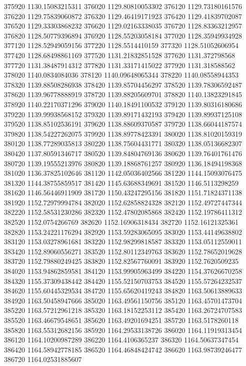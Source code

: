 {375920 1130.15083215311
376020 1129.80810053302
376120 1129.73180161576
376220 1129.75839060872
376320 1129.46419171923
376420 1129.41839702087
376520 1129.33303868232
376620 1129.02163338035
376720 1128.83363212957
376820 1128.50779396894
376920 1128.55203058184
377020 1128.35949934928
377120 1128.52949059156
377220 1128.5514410159
377320 1128.51052606954
377420 1128.68498861169
377520 1131.21832851528
377620 1131.372798568
377720 1131.38487914312
377820 1131.33171415022
377920 1131.318588562
378020 1140.0834084036
378120 1140.09648065344
378220 1140.08558944353
378320 1139.88508286938
378420 1139.85704456297
378520 1139.78306592487
378620 1139.96778888919
378720 1139.88205609701
378820 1140.13823291845
378920 1140.22170371296
379020 1140.18491100532
379120 1139.80316180686
379220 1139.99938568152
379320 1139.89171432193
379420 1139.89937125108
379520 1138.85102536191
379620 1138.88609370587
379720 1138.66044187574
379820 1138.54227262075
379920 1138.89778423391
380020 1138.81020159319
380120 1138.77289035813
380220 1138.75604431771
380320 1138.05136682307
380420 1137.80591346717
380520 1139.84804769136
380620 1139.76401761476
380720 1139.19555213976
380820 1139.18868761257
380920 1136.18494198368
381020 1136.37825102646
381120 1142.05036402566
381220 1144.15093076475
381320 1144.38755859517
381420 1145.63688349691
381520 1146.5113298259
381620 1146.56446911909
381720 1150.43247295156
381820 1151.71824371138
381920 1152.72979994784
382020 1152.62858824328
382120 1152.49727447344
382220 1152.58531230286
382320 1152.47802085868
382420 1152.19786411312
382520 1152.0754266769
382620 1152.16906318434
382720 1152.16121325361
382820 1153.24221176294
382920 1153.59283065095
383020 1153.44149638802
383120 1153.03278961681
383220 1152.98299818587
383320 1153.05112559011
383420 1152.89060556271
383520 1152.80112349763
383620 1152.78652019628
383720 1152.79880249425
383820 1152.82567760091
383920 1152.7620509235
384020 1153.94862859581
384120 1153.99905963499
384220 1154.37626670258
384320 1155.37309438442
384420 1155.52150703753
384520 1155.57264232537
384620 1155.60445329534
384720 1155.65620419243
384820 1163.50613889633
384920 1163.50458947666
385020 1163.49561150756
385120 1163.45701473704
385220 1163.57212961218
385320 1163.18152253112
385420 1163.26724707583
385520 1163.46679548651
385620 1163.49201694251
385720 1163.5178260118
385820 1163.55312682156
385920 1164.29533138726
386020 1164.11919313454
386120 1164.10200987289
386220 1164.4106365237
386320 1164.50637347454
386420 1164.58942778185
386520 1164.46848424742
386620 1163.98739246477
386720 1164.02531885607
}
